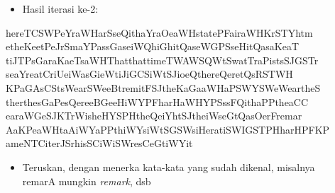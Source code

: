 \documentclass{article}
\begin{document}

\begin{itemize}
  \item Hasil iterasi ke-2:
\end{itemize}

\vspace{5mm}

\begin{flushleft}
hereTCSWPeYraWHarSseQithaYraOeaWHstatePFairaWHKrSTYhtm\\
etheKeetPeJrSmaYPassGaseiWQhiGhitQaseWGPSseHitQasaKeaT\\
tiJTPsGaraKaeTsaWHThatthattimeTWAWSQWtSwatTraPistsSJGSTr\\
seaYreatCriUeiWasGieWtiJiGCSiWtSJioeQthereQeretQsRSTWH\\
KPaGAsCStsWearSWeeBtremitFSJtheKaGaaWHaPSWYSWeWeartheS\\
therthesGaPesQereeBGeeHiWYPFharHaWHYPSssFQithaPPtheaCC\\
earaWGeSJKTrWisheHYSPHtheQeiYhtSJtheiWseGtQasOerFremar\\
AaKPeaWHtaAiWYaPPthiWYsiWtSGSWsiHeratiSWIGSTPHharHPFKP\\
ameNTCiterJSrhisSCiWiSWresCeGtiWYit
\end{flushleft}

\vspace{10mm}

\begin{itemize}
  \item Teruskan, dengan menerka kata-kata yang sudah dikenal, misalnya\\
  \quad remarA mungkin \textit{remark}, dsb
\end{itemize}
\end{document}

